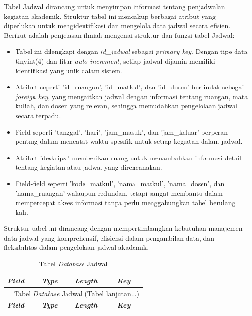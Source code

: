\begin{enumerate}
	      Tabel Jadwal dirancang untuk menyimpan informasi tentang penjadwalan kegiatan akademik. Struktur tabel ini mencakup berbagai atribut yang diperlukan untuk mengidentifikasi dan mengelola data jadwal secara efisien. Berikut adalah penjelasan ilmiah mengenai struktur dan fungsi tabel Jadwal:

	      \begin{itemize}
		      \item Tabel ini dilengkapi dengan \textit{id\_jadwal} sebagai \textit{primary key}. Dengan tipe data tinyint(4) dan fitur \textit{auto increment}, setiap jadwal dijamin memiliki identifikasi yang unik dalam sistem.
		      \item Atribut seperti 'id\_ruangan', 'id\_matkul', dan 'id\_dosen' bertindak sebagai \textit{foreign key}, yang mengaitkan jadwal dengan informasi tentang ruangan, mata kuliah, dan dosen yang relevan, sehingga memudahkan pengelolaan jadwal secara terpadu.
		      \item Field seperti 'tanggal', 'hari', 'jam\_masuk', dan 'jam\_keluar' berperan penting dalam mencatat waktu spesifik untuk setiap kegiatan dalam jadwal.
		      \item Atribut 'deskripsi' memberikan ruang untuk menambahkan informasi detail tentang kegiatan atau jadwal yang direncanakan.
		      \item Field-field seperti 'kode\_matkul', 'nama\_matkul', 'nama\_dosen', dan 'nama\_ruangan' walaupun redundan, tetapi sangat membantu dalam mempercepat akses informasi tanpa perlu menggabungkan tabel berulang kali.
	      \end{itemize}

	      Struktur tabel ini dirancang dengan mempertimbangkan kebutuhan manajemen data jadwal yang komprehensif, efisiensi dalam pengambilan data, dan fleksibilitas dalam pengelolaan jadwal akademik.

		      {
			      \fontsize{10}{12}\selectfont
			      \begin{longtable}{l l l l}
				      \caption{Tabel \textit{\textit{Database}} Jadwal}
				      \label{admin}                                                                                                   \\
				      \hline
				      \textbf{\textit{Field}} & \textbf{\textit{Type}} & \textbf{\textit{Length}} & \textbf{\textit{Key}}             \\
				      \hline
				      \endfirsthead

				      \multicolumn{4}{c}{\tablename\ \thetable\ {Tabel \textit{\textit{Database}} Jadwal} \space (Tabel lanjutan...)} \\
				      \hline
				      \textbf{\textit{Field}} & \textbf{\textit{Type}} & \textbf{\textit{Length}} & \textbf{\textit{Key}}             \\
				      \hline
				      \endhead


\end{longtable}}
\end{enumerate}
